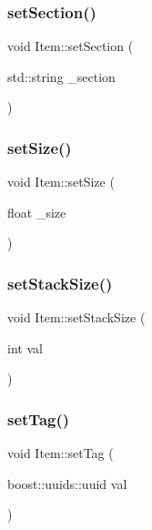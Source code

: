\subsubsection{\texorpdfstring{set\+Section()}{setSection()}}
{\footnotesize\ttfamily void Item\+::set\+Section (\begin{DoxyParamCaption}\item[{std\+::string}]{\+\_\+section }\end{DoxyParamCaption})}

\mbox{\label{class_item_a5ec923033eeb77f331c8307ef5141fc4}} 
\subsubsection{\texorpdfstring{set\+Size()}{setSize()}}
{\footnotesize\ttfamily void Item\+::set\+Size (\begin{DoxyParamCaption}\item[{float}]{\+\_\+size }\end{DoxyParamCaption})}

\mbox{\label{class_item_a0e0495bbb3eafeef69f8f8aa5bf94dbb}} 
\subsubsection{\texorpdfstring{set\+Stack\+Size()}{setStackSize()}}
{\footnotesize\ttfamily void Item\+::set\+Stack\+Size (\begin{DoxyParamCaption}\item[{int}]{val }\end{DoxyParamCaption})}

\mbox{\label{class_item_a18f7cd6d575a855529a4df7b47b3585e}} 
\subsubsection{\texorpdfstring{set\+Tag()}{setTag()}}
{\footnotesize\ttfamily void Item\+::set\+Tag (\begin{DoxyParamCaption}\item[{boost\+::uuids\+::uuid}]{val }\end{DoxyParamCaption})}

